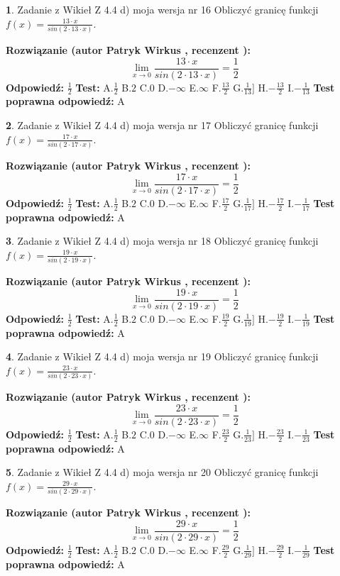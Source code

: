 \documentclass[12pt, a4paper]{article}
\theoremstyle{definition} %
\newtheorem{zad}{}
\newcommand{\zadStart}[1]{\begin{zad}#1\newline}
\newcommand{\zadStop}{\end{zad}}
\newcommand{\rozwStart}[2]{\noindent \textbf{Rozwiązanie (autor #1 , recenzent #2): }\newline}
\newcommand{\rozwStop}{\newline}
\newcommand{\odpStart}{\noindent \textbf{Odpowiedź:}\newline}
\newcommand{\odpStop}{\newline}
\newcommand{\testStart}{\noindent \textbf{Test:}\newline}
\newcommand{\testStop}{\newline}
\newcommand{\kluczStart}{\noindent \textbf{Test poprawna odpowiedź:}\newline}
\newcommand{\kluczStop}{\newline}
\begin{document}
\zadStart{Zadanie z Wikieł Z 4.4 d) moja wersja nr 16}
Obliczyć granicę funkcji $f(x)=\frac{13\cdot x}{sin(2 \cdot13\cdot x)}$.
\zadStop
\rozwStart{Patryk Wirkus}{}
$$\lim\limits_{x\to 0}\frac{13\cdot x}{sin(2 \cdot13\cdot x)}=\frac{1}{2}$$
\rozwStop
\odpStart
$\frac{1}{2}$
\odpStop
\testStart
A.$\frac{1}{2}$
B.$2$
C.$0$
D.$-\infty$
E.$\infty$
F.$\frac{13}{2}$
G.$\frac{1}{13}]$
H.$-\frac{13}{2}$
I.$-\frac{1}{13}$
\testStop
\kluczStart
A
\kluczStop



\zadStart{Zadanie z Wikieł Z 4.4 d) moja wersja nr 17}
Obliczyć granicę funkcji $f(x)=\frac{17\cdot x}{sin(2 \cdot17\cdot x)}$.
\zadStop
\rozwStart{Patryk Wirkus}{}
$$\lim\limits_{x\to 0}\frac{17\cdot x}{sin(2 \cdot17\cdot x)}=\frac{1}{2}$$
\rozwStop
\odpStart
$\frac{1}{2}$
\odpStop
\testStart
A.$\frac{1}{2}$
B.$2$
C.$0$
D.$-\infty$
E.$\infty$
F.$\frac{17}{2}$
G.$\frac{1}{17}]$
H.$-\frac{17}{2}$
I.$-\frac{1}{17}$
\testStop
\kluczStart
A
\kluczStop



\zadStart{Zadanie z Wikieł Z 4.4 d) moja wersja nr 18}
Obliczyć granicę funkcji $f(x)=\frac{19\cdot x}{sin(2 \cdot19\cdot x)}$.
\zadStop
\rozwStart{Patryk Wirkus}{}
$$\lim\limits_{x\to 0}\frac{19\cdot x}{sin(2 \cdot19\cdot x)}=\frac{1}{2}$$
\rozwStop
\odpStart
$\frac{1}{2}$
\odpStop
\testStart
A.$\frac{1}{2}$
B.$2$
C.$0$
D.$-\infty$
E.$\infty$
F.$\frac{19}{2}$
G.$\frac{1}{19}]$
H.$-\frac{19}{2}$
I.$-\frac{1}{19}$
\testStop
\kluczStart
A
\kluczStop



\zadStart{Zadanie z Wikieł Z 4.4 d) moja wersja nr 19}
Obliczyć granicę funkcji $f(x)=\frac{23\cdot x}{sin(2 \cdot23\cdot x)}$.
\zadStop
\rozwStart{Patryk Wirkus}{}
$$\lim\limits_{x\to 0}\frac{23\cdot x}{sin(2 \cdot23\cdot x)}=\frac{1}{2}$$
\rozwStop
\odpStart
$\frac{1}{2}$
\odpStop
\testStart
A.$\frac{1}{2}$
B.$2$
C.$0$
D.$-\infty$
E.$\infty$
F.$\frac{23}{2}$
G.$\frac{1}{23}]$
H.$-\frac{23}{2}$
I.$-\frac{1}{23}$
\testStop
\kluczStart
A
\kluczStop



\zadStart{Zadanie z Wikieł Z 4.4 d) moja wersja nr 20}
Obliczyć granicę funkcji $f(x)=\frac{29\cdot x}{sin(2 \cdot29\cdot x)}$.
\zadStop
\rozwStart{Patryk Wirkus}{}
$$\lim\limits_{x\to 0}\frac{29\cdot x}{sin(2 \cdot29\cdot x)}=\frac{1}{2}$$
\rozwStop
\odpStart
$\frac{1}{2}$
\odpStop
\testStart
A.$\frac{1}{2}$
B.$2$
C.$0$
D.$-\infty$
E.$\infty$
F.$\frac{29}{2}$
G.$\frac{1}{29}]$
H.$-\frac{29}{2}$
I.$-\frac{1}{29}$
\testStop
\kluczStart
A
\kluczStop
\end{document}

